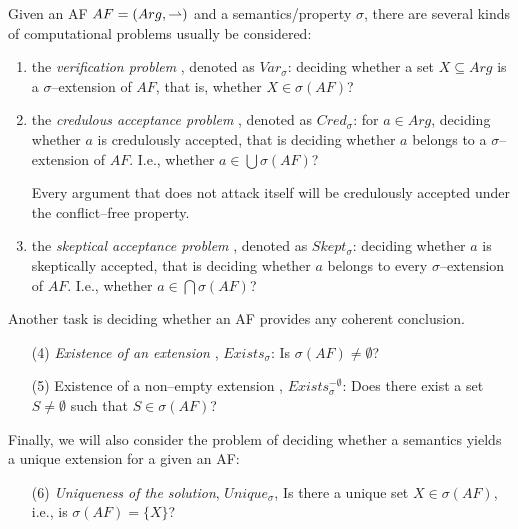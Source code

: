 Given an AF $AF=(Arg,\rightharpoonup)$ and a semantics/property $\sigma$, 
there are several kinds of computational problems usually be considered:
\begin{enumerate}[itemsep=5pt,parsep=5pt,leftmargin=3em,topsep=5pt,label=(\arabic*)] %
    \item 
    the \textit{verification problem}  , 
    denoted as {\color{purple} $Var_\sigma$}: 
    deciding whether a set $X \subseteq Arg$ is a $\sigma$--extension of $AF$, 
    that is, whether $X \in \sigma(AF)$?

    \item 
    the \textit{credulous acceptance problem} , 
    denoted as {\color{purple} $Cred_\sigma$}: 
    for $a \in Arg$, 
    deciding whether $a$ is credulously accepted, 
    that is deciding whether $a$ belongs to a $\sigma$--extension of $AF$. 
    I.e., whether $a \in \bigcup \sigma(AF)$?

    Every argument that does not attack itself will be credulously accepted under the conflict--free property.

    \item 
    the \textit{skeptical acceptance problem} , 
    denoted as {\color{purple} $Skept_\sigma$}: 
    deciding whether $a$ is skeptically  accepted, 
    that is deciding whether $a$ belongs to every $\sigma$--extension of $AF$.
    I.e.,  whether $a \in \bigcap \sigma(AF)$?
\end{enumerate}


Another task is deciding whether an AF provides any coherent conclusion.
\begin{enumerate}[itemsep=5pt,parsep=5pt,leftmargin=3em,topsep=5pt] 
    \item[(4)] 
    \textit{Existence of an extension} , 
    {\color{purple} $Exists_\sigma$}: Is $\sigma(AF) \not= \emptyset$?

    \item[(5)] 
    Existence of a non--empty extension , 
    {\color{purple} $Exists_\sigma^{-\emptyset}$}: 
    Does there exist a set $S \not=\emptyset$ such that $S \in\sigma(AF)$?
\end{enumerate}


Finally, 
we will also consider the problem of deciding whether a semantics
yields a unique extension for a given an AF:
\begin{enumerate}[itemsep=5pt,parsep=5pt,leftmargin=3em,topsep=5pt,] 
    \item[(6)]
    \textit{Uniqueness of the solution}, 
    {\color{purple} $Unique_\sigma$}, 
    Is there a unique set $X \in \sigma(AF)$, i.e., 
    is $\sigma(AF)=\{X\}$?
\end{enumerate}



